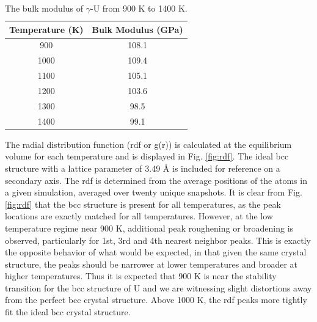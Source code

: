 \documentclass[review]{elsarticle}
\begin{document}
\begin{table}[h]
\caption{The bulk modulus of $\gamma$-U from 900 K to 1400 K.} \label{tab:bulk}
\begin{center}
\begin{tabular}{|c|c|}
	\hline
	Temperature (K) & Bulk Modulus (GPa) \\
	 \hline
	 900 & 108.1 \\
	 1000 & 109.4 \\
	 1100 & 105.1 \\
	 1200 & 103.6 \\	 
	 1300 & 98.5\\
	 1400 & 99.1 \\
	 \hline
\end{tabular}
\end{center}
\label{default}
\end{table}

\FloatBarrier

The radial distribution function (rdf or g(r)) is calculated at the equilibrium volume for each temperature and is displayed in Fig. \ref{fig:rdf}. The ideal bcc structure with a lattice parameter of 3.49 {\AA} is included for reference on a secondary axis. The rdf is determined from the average positions of the atoms in a given simulation, averaged over twenty unique snapshots. It is clear from Fig. \ref{fig:rdf} that the bcc structure is present for all temperatures, as the peak locations are exactly matched for all temperatures. However, at the low temperature regime near 900 K, additional peak roughening or broadening is observed, particularly for 1st, 3rd and 4th nearest neighbor peaks. This is exactly the opposite behavior of what would be expected, in that given the same crystal structure, the peaks should be narrower at lower temperatures and broader at higher temperatures. Thus it is expected that 900 K is near the stability transition for the bcc structure of U and we are witnessing slight distortions away from the perfect bcc crystal structure. Above 1000 K, the rdf peaks more tightly fit the ideal bcc crystal structure.
\end{document}
